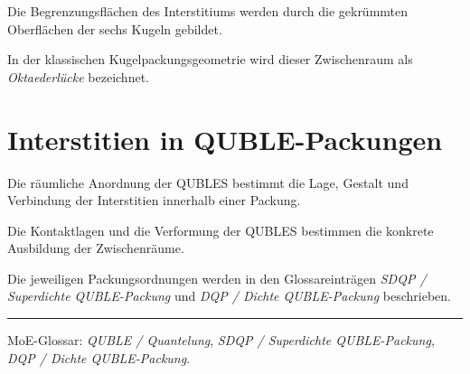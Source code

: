 \documentclass[11pt,a4paper]{article}
\begin{document}
Die Begrenzungsflächen des Interstitiums
werden durch die gekrümmten Oberflächen
der sechs Kugeln gebildet.

In der klassischen Kugelpackungsgeometrie
wird dieser Zwischenraum als
\emph{Oktaederlücke} bezeichnet.

\section*{Interstitien in QUBLE-Packungen}

Die räumliche Anordnung der QUBLES bestimmt
die Lage, Gestalt und Verbindung der
Interstitien innerhalb einer Packung.

Die Kontaktlagen und die Verformung der
QUBLES bestimmen die konkrete Ausbildung
der Zwischenräume.

Die jeweiligen Packungsordnungen werden
in den Glossareinträgen
\emph{SDQP / Superdichte QUBLE-Packung}
und
\emph{DQP / Dichte QUBLE-Packung}
beschrieben.

\vspace{0.9em}
\hrule
\vspace{0.45em}

{\footnotesize
MoE-Glossar:
\emph{QUBLE / Quantelung},
\emph{SDQP / Superdichte QUBLE-Packung},
\emph{DQP / Dichte QUBLE-Packung}.
}
\end{document}
